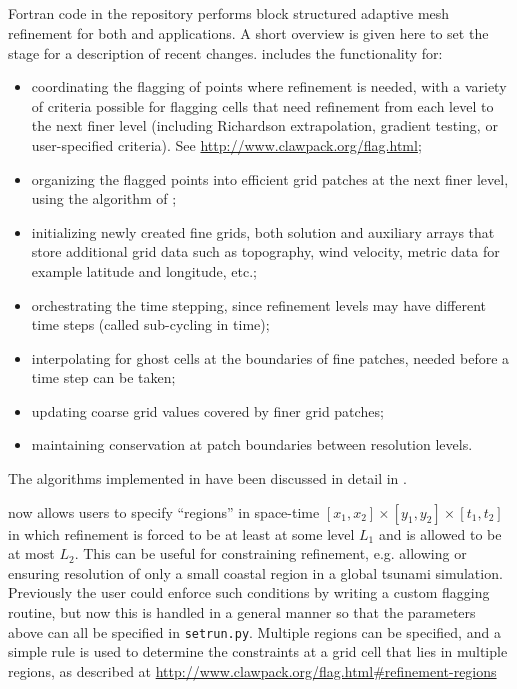%
%
%

\subsection{\amrclaw}\label{sec:amrclaw}
Fortran code in the \amrclaw repository performs block structured adaptive mesh
refinement \cite{BO,BC} for both
\clawpack and \geoclaw  applications.
A short overview is given
here to set the stage for a description of recent changes.
\amrclaw includes the functionality for:
\begin{itemize}
\item
coordinating the flagging of points where refinement is needed,
with a variety of criteria possible for flagging cells that need refinement
from each level to the next finer level (including Richardson extrapolation,
gradient testing, or user-specified criteria).  See
\url{http://www.clawpack.org/flag.html};
\item
organizing the flagged points into efficient grid
patches at the next finer level, using the algorithm of
\cite{mjb-rig:cluster};
\item
initializing newly created fine grids, both solution and auxiliary arrays that store additional grid data such as topography, wind velocity, metric data for example latitude and longitude, etc.;
\item
orchestrating the time stepping, since refinement levels may have
different time steps ({called sub-cycling in time});
\item
interpolating for ghost cells at the boundaries of fine patches,
needed before a time step can be taken;
\item
updating coarse grid values covered by finer grid patches;
\item
maintaining conservation at patch boundaries between resolution levels.
\end{itemize}
The algorithms implemented in \amrclaw have been discussed in detail in
\cite{mjb-rjl:amrclaw,LeVequeGeorgeBerger:an11}.

\amrclaw now allows users to specify ``regions'' in space-time
$[x_1,x_2] \times [y_1,y_2] \times [t_1,t_2]$ in which refinement is forced to
be at least at some level $L_1$ and is allowed to be at most $L_2$.  This can be
useful for constraining refinement, e.g. allowing or ensuring resolution of only a small coastal region in a global tsunami simulation.
Previously the user could enforce such conditions by writing a custom
flagging routine, but now this is handled in a general manner so that the
parameters above can all be specified in \texttt{setrun.py}.  Multiple
regions can be specified, and a simple rule is used to determine the
constraints at a grid cell that lies in multiple regions, as described at
\url{http://www.clawpack.org/flag.html#refinement-regions}

